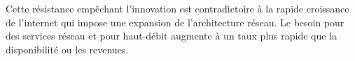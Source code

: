 




Cette résistance empêchant l'innovation est contradictoire à la rapide croissance de l'internet qui impose une expansion de l'architecture réseau. 
Le besoin pour des services réseau et pour haut-débit augmente à un taux plus rapide que la disponibilité ou les revenues.



